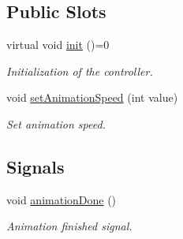 \subsection*{Public Slots}
\begin{DoxyCompactItemize}
\item 
virtual void \hyperlink{classWorldAbstractController_af2ab5103153a68f66dcdf75d6c9a4d93}{init} ()=0
\begin{DoxyCompactList}\small\item\em Initialization of the controller. \end{DoxyCompactList}\item 
void \hyperlink{classWorldAbstractController_ab271df7d1af98b87afc0d50a4156616a}{set\+Animation\+Speed} (int value)
\begin{DoxyCompactList}\small\item\em Set animation speed. \end{DoxyCompactList}\end{DoxyCompactItemize}
\subsection*{Signals}
\begin{DoxyCompactItemize}
\item 
void \hyperlink{classWorldAbstractController_ae967946c752a88d3e18a365389f349eb}{animation\+Done} ()
\begin{DoxyCompactList}\small\item\em Animation finished signal. \end{DoxyCompactList}\end{DoxyCompactItemize}
